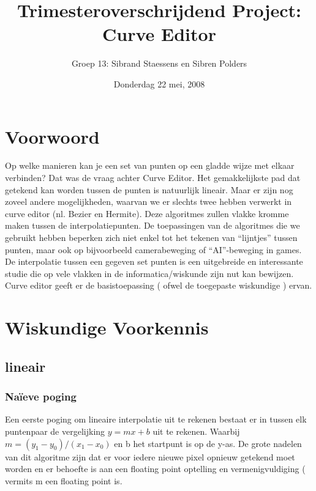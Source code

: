 \documentclass[a4paper,11pt,oneside, titlepage]{article}
\author{Groep 13: Sibrand Staessens en Sibren Polders}
\title{Trimesteroverschrijdend Project: Curve Editor}
\date{Donderdag 22 mei, 2008}
\begin{document}
\maketitle \newpage
\tableofcontents \newpage
\section{Voorwoord}
Op welke manieren kan je een set van punten op een gladde wijze met elkaar verbinden? Dat was
de vraag achter Curve Editor. Het gemakkelijkste pad dat getekend kan worden tussen de punten
is natuurlijk lineair. Maar er zijn nog zoveel andere mogelijkheden, waarvan we er
slechts twee hebben verwerkt in curve editor (nl. Bezier en Hermite). Deze algoritmes zullen
vlakke kromme maken tussen de interpolatiepunten. De toepassingen van de algoritmes die we 
gebruikt hebben beperken zich niet enkel tot het tekenen van ``lijntjes'' tussen punten, 
maar ook op bijvoorbeeld camerabeweging of ``AI''-beweging in games.
De interpolatie tussen een gegeven set punten is een uitgebreide en interessante studie die 
op vele vlakken in de informatica/wiskunde zijn nut kan bewijzen. Curve editor geeft er de 
basistoepassing ( ofwel de toegepaste wiskundige ) ervan. \newline \newline \newline \newline
\newline \newline \newline \newline
\newpage
\section{Wiskundige Voorkennis}
\subsection{lineair}
\subsubsection{Na\"ieve poging}
Een eerste poging om lineaire interpolatie uit te rekenen bestaat er in tussen elk puntenpaar
de vergelijking \begin{math}y = mx + b\end{math} uit te rekenen. 
Waarbij \begin{math}m = (y_1-y_0)/(x_1-x_0)\end{math} en b het
startpunt is op de y-as. De grote nadelen van dit algoritme zijn dat er voor iedere nieuwe
pixel opnieuw getekend moet worden en er behoefte is aan een floating point optelling en 
vermenigvuldiging ( vermits m een floating point is.
\end{document}
